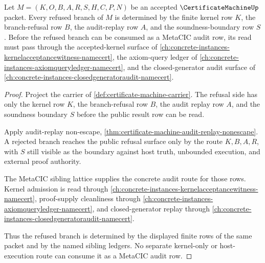 \begin{theorem}
\label{thm:certificate-machine-branch-refusal-determinacy}
Let $M=(K,O,B,A,R,S,H,C,P,N)$ be an accepted $\CertificateMachineUp$ packet. Every refused branch of $M$ is determined by the finite kernel row $K$, the branch-refusal row $B$, the audit-replay row $A$, and the soundness-boundary row $S$. Before the refused branch can be consumed as a MetaCIC audit row, its read must pass through the accepted-kernel surface of \autoref{ch:concrete-instances-kernelacceptancewitness-namecert}, the axiom-query ledger of \autoref{ch:concrete-instances-axiomqueryledger-namecert}, and the closed-generator audit surface of \autoref{ch:concrete-instances-closedgeneratoraudit-namecert}.
\end{theorem}
\begin{proof}
Project the carrier of \autoref{def:certificate-machine-carrier}. The refusal side has only the kernel row $K$, the branch-refusal row $B$, the audit replay row $A$, and the soundness boundary $S$ before the public result row can be read.

Apply audit-replay non-escape, \autoref{thm:certificate-machine-audit-replay-nonescape}. A rejected branch reaches the public refusal surface only by the route $K,B,A,R$, with $S$ still visible as the boundary against host truth, unbounded execution, and external proof authority.

The MetaCIC sibling lattice supplies the concrete audit route for those rows. Kernel admission is read through \autoref{ch:concrete-instances-kernelacceptancewitness-namecert}, proof-supply cleanliness through \autoref{ch:concrete-instances-axiomqueryledger-namecert}, and closed-generator replay through \autoref{ch:concrete-instances-closedgeneratoraudit-namecert}.

Thus the refused branch is determined by the displayed finite rows of the same packet and by the named sibling ledgers. No separate kernel-only or host-execution route can consume it as a MetaCIC audit row.
\end{proof}



